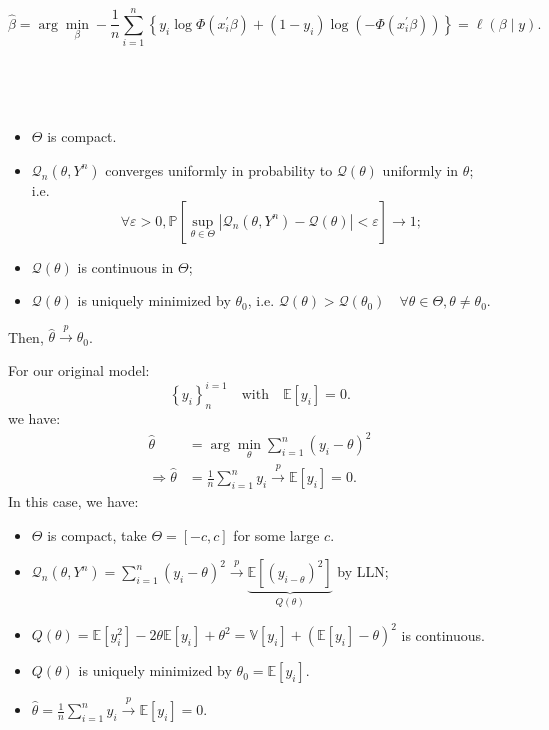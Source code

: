 \begin{eg}
    \[
    \hat{\beta} = \arg \min_{\beta} -\frac{1}{n} \sum_{i=1}^{n} \left\{y_i \log \Phi\left(x_i^{\prime} \beta\right) + (1-y_i) \log \left(-\Phi\left(x_i^{\prime} \beta\right)\right)\right\} = \ell(\beta \mid y).
    \]
\end{eg}

\begin{proposition} \label{prop:consistency}
    \ 
    
    \begin{assumption}
        \

        \begin{itemize}
            \item $\Theta$ is compact.
            \item $\mathcal{Q}_n(\theta, Y^n)$ converges uniformly in probability to $\mathcal{Q}(\theta)$ uniformly in $\theta$;\\
            i.e. \[
            \forall \varepsilon > 0, \mathbb{P}\left[\sup_{\theta \in \Theta} \left| \mathcal{Q}_n(\theta, Y^n) - \mathcal{Q}(\theta) \right| < \varepsilon\right] \to 1;
            \]
            \item $\mathcal{Q}(\theta)$ is continuous in $\Theta$;
            \item $\mathcal{Q}(\theta)$ is uniquely minimized by $\theta_0$, i.e. $\mathcal{Q}(\theta) > \mathcal{Q}(\theta_0) \quad \forall \theta \in \Theta, \theta \neq \theta_0.$
        \end{itemize}
    \end{assumption}   
    Then, $\hat{\theta} \overset{p}{\rightarrow} \theta_0$.
\end{proposition}

For our original model:
\[
\left\{ y_i \right\}^{i=1}_{n} \quad \text{with} \quad \mathbb{E}[y_i]=0.
\]
we have:
\begin{align*}
    \hat{\theta} &= \arg \min_{\theta} \sum_{i=1}^{n} \left(y_{i}-\theta \right)^2 \\
    \Rightarrow \hat{\theta} &= \frac{1}{n} \sum_{i=1}^{n} y_i \overset{p}{\rightarrow} \mathbb{E}[y_i] = 0.
\end{align*}
In this case, we have:
\begin{itemize}
    \item $\Theta$ is compact, take $\Theta = [-c, c]$ for some large $c$.
    \item $\mathcal{Q}_n(\theta, Y^n) = \sum_{i=1}^{n} \left(y_i - \theta\right)^2 \overset{p}{\rightarrow} \underset{Q (\theta)}{\underbrace{\mathbb{E}\left[(y_{i-\theta})^2\right]}}$ by LLN;
    \item $Q (\theta) = \mathbb{E}[y_i^2] - 2 \theta \mathbb{E}[y_i] + \theta^2 = \mathbb{V}[y_i] + \left( \mathbb{E}[y_i]-\theta \right)^2$ is continuous.
    \item $Q (\theta)$ is uniquely minimized by $\theta_0 = \mathbb{E}[y_i]$.
    \item $\hat{\theta} = \frac{1}{n} \sum_{i=1}^{n} y_i \overset{p}{\rightarrow} \mathbb{E}[y_i] = 0$.
\end{itemize}


